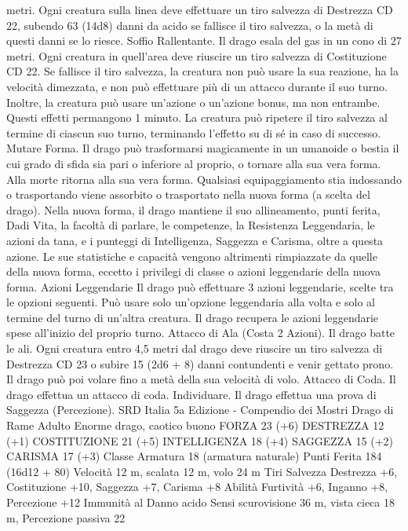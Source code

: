 \begin{multicols}{2}
metri. Ogni creatura sulla linea deve effettuare un tiro salvezza di
Destrezza CD 22, subendo 63 (14d8) danni da acido se fallisce il tiro
salvezza, o la metà di questi danni se lo riesce.
Soffio Rallentante. Il drago esala del gas in un cono di 27 metri. Ogni
creatura in quell’area deve riuscire un tiro salvezza di Costituzione
CD 22. Se fallisce il tiro salvezza, la creatura non può usare la sua
reazione, ha la velocità dimezzata, e non può effettuare più di un
attacco durante il suo turno. Inoltre, la creatura può usare un’azione o
un’azione bonus, ma non entrambe. Questi effetti permangono 1
minuto. La creatura può ripetere il tiro salvezza al termine di ciascun
suo turno, terminando l’effetto su di sé in caso di successo.
Mutare Forma. Il drago può trasformarsi magicamente in un
umanoide o bestia il cui grado di sfida sia pari o inferiore al proprio,
o tornare alla sua vera forma. Alla morte ritorna alla sua vera forma.
Qualsiasi equipaggiamento stia indossando o trasportando viene
assorbito o trasportato nella nuova forma (a scelta del drago).
Nella nuova forma, il drago mantiene il suo allineamento, punti
ferita, Dadi Vita, la facoltà di parlare, le competenze, la Resistenza
Leggendaria, le azioni da tana, e i punteggi di Intelligenza, Saggezza
e Carisma, oltre a questa azione. Le sue statistiche e capacità
vengono altrimenti rimpiazzate da quelle della nuova forma, eccetto i
privilegi di classe o azioni leggendarie della nuova forma.
Azioni Leggendarie
Il drago può effettuare 3 azioni leggendarie, scelte tra le opzioni
seguenti. Può usare solo un’opzione leggendaria alla volta e solo
al termine del turno di un’altra creatura. Il drago recupera le
azioni leggendarie spese all’inizio del proprio turno.
Attacco di Ala (Costa 2 Azioni). Il drago batte le ali. Ogni
creatura entro 4,5 metri dal drago deve riuscire un tiro salvezza
di Destrezza CD 23 o subire 15 (2d6 + 8) danni contundenti e
venir gettato prono. Il drago può poi volare fino a metà della sua
velocità di volo.
Attacco di Coda. Il drago effettua un attacco di coda.
Individuare. Il drago effettua una prova di Saggezza
(Percezione).
SRD Italia 5a Edizione - Compendio dei Mostri
Drago di Rame Adulto
Enorme drago, caotico buono
FORZA 23 (+6)
DESTREZZA 12 (+1)
COSTITUZIONE 21 (+5)
INTELLIGENZA 18 (+4)
SAGGEZZA 15 (+2)
CARISMA 17 (+3)
Classe Armatura 18 (armatura naturale)
Punti Ferita 184 (16d12 + 80)
Velocità 12 m, scalata 12 m, volo 24 m
Tiri Salvezza Destrezza +6, Costituzione +10, Saggezza +7, Carisma +8
Abilità Furtività +6, Inganno +8, Percezione +12
Immunità al Danno acido
Sensi scurovisione 36 m, vista cieca 18 m, Percezione passiva 22

\end{multicols}
